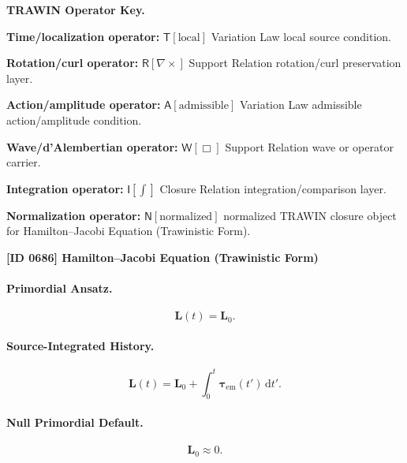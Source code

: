 \par\vspace{0.45\baselineskip}
\noindent\begin{minipage}[t]{\linewidth}
\begingroup
\small
\raggedright
\textbf{TRAWIN Operator Key.}\par
\noindent\textbf{Time/localization operator:} $\mathsf{T}\!\left[\mathrm{local}\right]$ Variation Law local source condition.\par
\noindent\textbf{Rotation/curl operator:} $\mathsf{R}\!\left[\nabla\times\right]$ Support Relation rotation/curl preservation layer.\par
\noindent\textbf{Action/amplitude operator:} $\mathsf{A}\!\left[\mathrm{admissible}\right]$ Variation Law admissible action/amplitude condition.\par
\noindent\textbf{Wave/d'Alembertian operator:} $\mathsf{W}\!\left[\Box\right]$ Support Relation wave or operator carrier.\par
\noindent\textbf{Integration operator:} $\mathsf{I}\!\left[\int\right]$ Closure Relation integration/comparison layer.\par
\noindent\textbf{Normalization operator:} $\mathsf{N}\!\left[\mathrm{normalized}\right]$ normalized TRAWIN closure object for Hamilton--Jacobi Equation (Trawinistic Form).\par
\endgroup
\end{minipage}

\clearpage
\noindent\textbf{[ID 0686] Hamilton--Jacobi Equation (Trawinistic Form)}\par
\vspace{0.35em}
\paragraph{Primordial Ansatz.}
\begin{equation}
\mathbf{L}(t)=\mathbf{L}_0 .
\end{equation}

\paragraph{Source-Integrated History.}
\begin{equation}
\mathbf{L}(t)
=
\mathbf{L}_0
+
\int_0^t
\boldsymbol{\tau}_{\mathrm{em}}(t')
\,\mathrm{d}t' .
\end{equation}

\paragraph{Null Primordial Default.}
\begin{equation}
\mathbf{L}_0\approx 0 .
\end{equation}

